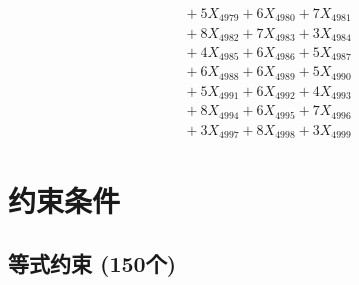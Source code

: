 \documentclass[a4paper,10pt]{article}
\begin{document}
{\begin{align}
&\;  + 5 X_{4979} + 6 X_{4980} + 7 X_{4981} \\[0.3ex]
&\;  + 8 X_{4982} + 7 X_{4983} + 3 X_{4984} \\[0.3ex]
&\;  + 4 X_{4985} + 6 X_{4986} + 5 X_{4987} \\[0.3ex]
&\;  + 6 X_{4988} + 6 X_{4989} + 5 X_{4990} \\[0.5ex]\allowbreak
&\;  + 5 X_{4991} + 6 X_{4992} + 4 X_{4993} \\[0.3ex]
&\;  + 8 X_{4994} + 6 X_{4995} + 7 X_{4996} \\[0.3ex]
&\;  + 3 X_{4997} + 8 X_{4998} + 3 X_{4999}\nonumber
\end{align}
}

\section{约束条件}

\subsection{等式约束 (150个)}
\end{document}
